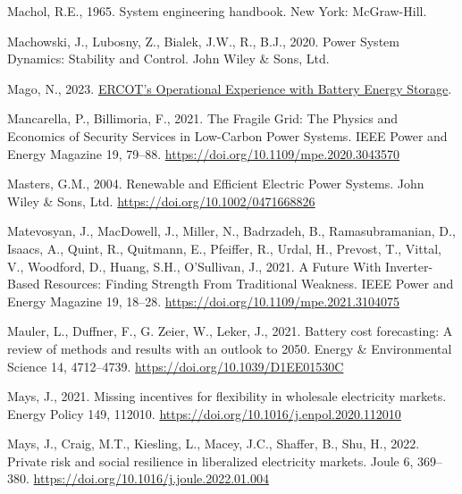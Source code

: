 \documentclass[12pt,a4paper,]{report}
\newlength{\cslhangindent}
\newenvironment{CSLReferences}[2] %
 {%
  \setlength{\parindent}{0pt}
  \ifodd #1 \everypar{\setlength{\hangindent}{\cslhangindent}}\ignorespaces\fi
  \ifnum #2 > 0
  \setlength{\parskip}{#2\baselineskip}
  \fi
 }%
 {}
\begin{document}
\begin{CSLReferences}{1}{0}
\leavevmode{}%
Machol, R.E., 1965. System engineering handbook. New York: McGraw-Hill.

\leavevmode{}%
Machowski, J., Lubosny, Z., Bialek, J.W., R., B.J., 2020. Power {System
Dynamics}: {Stability} and {Control}. John Wiley \& Sons, Ltd.

\leavevmode{}%
Mago, N., 2023.
\href{https://www.esig.energy/event/g-pst-esig-webinar-series-operational-experience-with-battery-energy-storage-in-ercot/}{{ERCOT}'s
{Operational Experience} with {Battery Energy Storage}}.

\leavevmode{}%
Mancarella, P., Billimoria, F., 2021. The {Fragile Grid}: {The Physics}
and {Economics} of {Security Services} in {Low-Carbon Power Systems}.
IEEE Power and Energy Magazine 19, 79--88.
\url{https://doi.org/10.1109/mpe.2020.3043570}

\leavevmode{}%
Masters, G.M., 2004. Renewable and {Efficient Electric Power Systems}.
John Wiley \& Sons, Ltd. \url{https://doi.org/10.1002/0471668826}

\leavevmode{}%
Matevosyan, J., MacDowell, J., Miller, N., Badrzadeh, B.,
Ramasubramanian, D., Isaacs, A., Quint, R., Quitmann, E., Pfeiffer, R.,
Urdal, H., Prevost, T., Vittal, V., Woodford, D., Huang, S.H.,
O'Sullivan, J., 2021. A {Future With Inverter-Based Resources}: {Finding
Strength From Traditional Weakness}. IEEE Power and Energy Magazine 19,
18--28. \url{https://doi.org/10.1109/mpe.2021.3104075}

\leavevmode{}%
Mauler, L., Duffner, F., G. Zeier, W., Leker, J., 2021. Battery cost
forecasting: A review of methods and results with an outlook to 2050.
Energy \& Environmental Science 14, 4712--4739.
\url{https://doi.org/10.1039/D1EE01530C}

\leavevmode{}%
Mays, J., 2021. Missing incentives for flexibility in wholesale
electricity markets. Energy Policy 149, 112010.
\url{https://doi.org/10.1016/j.enpol.2020.112010}

\leavevmode{}%
Mays, J., Craig, M.T., Kiesling, L., Macey, J.C., Shaffer, B., Shu, H.,
2022. Private risk and social resilience in liberalized electricity
markets. Joule 6, 369--380.
\url{https://doi.org/10.1016/j.joule.2022.01.004}


\end{CSLReferences}
\end{document}
